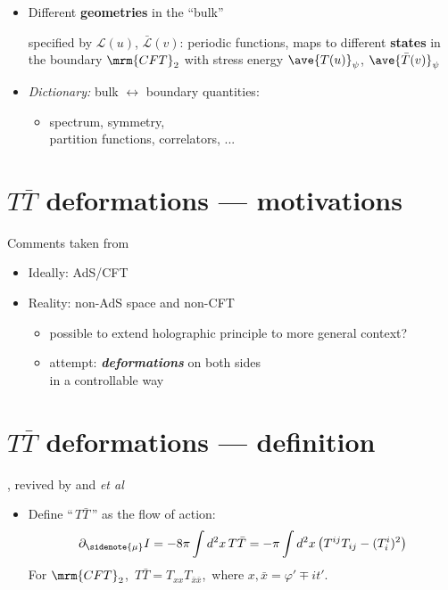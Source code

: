 \documentclass[11pt]{article}
\renewenvironment{frame}[1]%
	{\section*{#1}}%
	{}
\newcommand{\TTbar}{\texorpdfstring{\ensuremath{T\bar{T}}}{TTbar}\xspace}
\begin{document}
\begin{multicols}{3}
\begin{itemize}
\item Different \textbf{geometries} in the ``bulk''

specified by $\mathcal L(u)$, $\bar{\mathcal L}(v)$: periodic functions, maps to different \textbf{states} in the boundary $\mrm{CFT}_2$ with stress energy $\ave{T(u)}_\psi$, $\ave{\bar{T}(v)}_\psi$

\item \textit{Dictionary:} bulk $\leftrightarrow$ boundary quantities:
	\begin{itemize}
	\item spectrum,
		symmetry,\\
		partition functions,
		correlators, ...
	\end{itemize}
\end{itemize}

\begin{frame}{\TTbar deformations --- motivations}{%
	Comments taken from \textcite{Cui:2023jrb}
}
	\begin{itemize}
	\item Ideally: AdS/CFT
	\item Reality: non-AdS space and non-CFT
	\begin{itemize}
		\item possible to extend holographic principle to more general context?
		\item attempt: \textbf{\textit{deformations}} on both sides\\
		in a controllable way
	\end{itemize}
	\end{itemize}
\end{frame}

\newcommand{\citeTTbar}{%
	\textcite{Zamolodchikov:2004ce}, revived by \textcite{Smirnov:2016lqw} and \textcite{Cavaglia:2016oda} \textit{et al}
}


\begin{frame}{\TTbar deformations --- definition}{%
	\citeTTbar
}
\begin{itemize}

\item Define ``\,\TTbar\,'' as the flow of action:
\begin{equation}
	\partial_{\sidenote{\mu}} I = -{8 \pi} \int d^2x \, T\bar T =  -{\pi} \int d^2x\,\big( T^{ij}T_{ij}- (T^i_i)^2 \big)
	\label{TTbardef}
\end{equation}
For $\mrm{CFT}_2$,\ $T\bar{T} = T_{xx} T_{\bar{x}\bar{x}}$,\ where $x, \bar{x} = \varphi' \mp it'$.


\end{itemize}
\end{frame}
\end{multicols}
\end{document}
